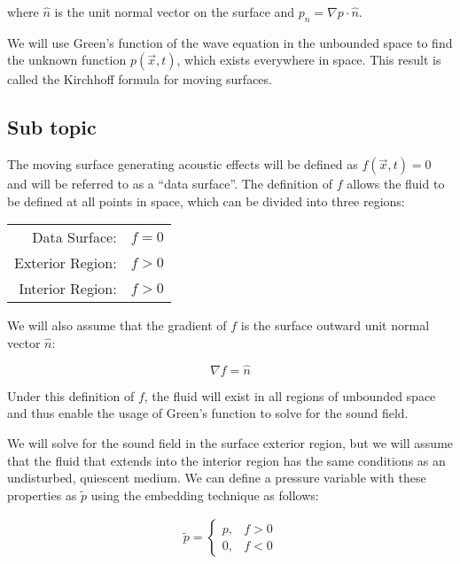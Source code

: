 \documentclass[]{aiaa-tc}%
\begin{document}
\noindent where $\hat{n}$ is the unit normal vector on the surface and $p_n = \nabla p \cdot \hat{n}$.

We will use Green’s function of the wave equation in the unbounded space to find the unknown function $p(\vec{x},t)$, which exists everywhere in space. This result is called the Kirchhoff formula for moving surfaces.


\subsection{Sub topic}

The moving surface generating acoustic effects will be defined as $f(\vec{x},t) = 0$ and will be referred to as a ``data surface''.  The definition of $f$ allows the fluid to be defined at all points in space, which can be divided into three regions:

\begin{center}
\begin{tabular}{| r  l |}
  \hline
  Data Surface:    & $f=0$ \\
  Exterior Region: & $f>0$ \\
  Interior Region: & $f>0$ \\
  \hline
\end{tabular}
\end{center}

\noindent We will also assume that the gradient of $f$ is the surface outward unit normal vector $\hat{n}$:

\begin{equation} \label{Gradfnormal}
\nabla f = \hat{n}
\end{equation}

Under this definition of $f$, the fluid will exist in all regions of unbounded space and thus enable the usage of Green's function to solve for the sound field.

We will solve for the sound field in the surface exterior region, but we will assume that the fluid that extends into the interior region has the same conditions as an undisturbed, quiescent medium.  We can define a pressure variable with these properties as $\widetilde{p}$ using the embedding technique as follows:

\begin{equation} \label{Ptilde}
\begin{split}
\boxed{\widetilde{p} =
    \left\{ \begin{array}{lll}
        p, & f > 0 \\
        0, & f < 0
    \end{array} \right.}
\end{split}
\end{equation}
\end{document}
